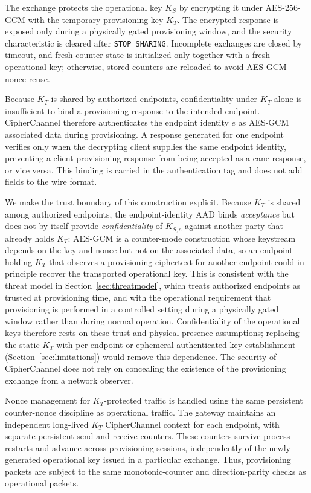 \documentclass[journal]{IEEEtran}
\begin{document}
The exchange protects the operational key \(K_S\) by encrypting it under AES-256-GCM with the temporary provisioning key \(K_T\). The encrypted response is exposed only during a physically gated provisioning window, and the security characteristic is cleared after \texttt{STOP\_SHARING}. Incomplete exchanges are closed by timeout, and fresh counter state is initialized only together with a fresh operational key; otherwise, stored counters are reloaded to avoid AES-GCM nonce reuse.

Because \(K_T\) is shared by authorized endpoints, confidentiality under \(K_T\) alone is insufficient to bind a provisioning response to the intended endpoint. CipherChannel therefore authenticates the endpoint identity \(e\) as AES-GCM associated data during provisioning. A response generated for one endpoint verifies only when the decrypting client supplies the same endpoint identity, preventing a client provisioning response from being accepted as a cane response, or vice versa. This binding is carried in the authentication tag and does not add fields to the wire format.

We make the trust boundary of this construction explicit. Because \(K_T\) is shared among authorized endpoints, the endpoint-identity AAD binds \emph{acceptance} but does not by itself provide \emph{confidentiality} of \(K_{S,e}\) against another party that already holds \(K_T\): AES-GCM is a counter-mode construction whose keystream depends on the key and nonce but not on the associated data, so an endpoint holding \(K_T\) that observes a provisioning ciphertext for another endpoint could in principle recover the transported operational key. This is consistent with the threat model in Section~\ref{sec:threatmodel}, which treats authorized endpoints as trusted at provisioning time, and with the operational requirement that provisioning is performed in a controlled setting during a physically gated window rather than during normal operation. Confidentiality of the operational keys therefore rests on these trust and physical-presence assumptions; replacing the static \(K_T\) with per-endpoint or ephemeral authenticated key establishment (Section~\ref{sec:limitations}) would remove this dependence. The security of CipherChannel does not rely on concealing the existence of the provisioning exchange from a network observer.

Nonce management for \(K_T\)-protected traffic is handled using the same persistent counter-nonce discipline as operational traffic. The gateway maintains an independent long-lived \(K_T\) CipherChannel context for each endpoint, with separate persistent send and receive counters. These counters survive process restarts and advance across provisioning sessions, independently of the newly generated operational key issued in a particular exchange. Thus, provisioning packets are subject to the same monotonic-counter and direction-parity checks as operational packets.
\end{document}
